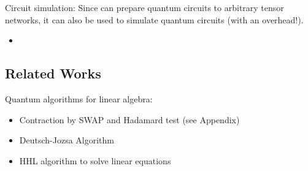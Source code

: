 Circuit simulation:
Since \qcreason{} can prepare quantum circuits to arbitrary tensor networks, it can also be used to simulate quantum circuits (with an overhead!).
\begin{itemize}
    \item \cite{sander_large-scale_2025,sander_quantum_2025}
\end{itemize}

\subsection{Related Works}

Quantum algorithms for linear algebra:
\begin{itemize}
    \item Contraction by SWAP and Hadamard test (see Appendix)
    \item Deutsch-Jozsa Algorithm
    \item HHL algorithm to solve linear equations \cite{harrow_quantum_2009}
\end{itemize}